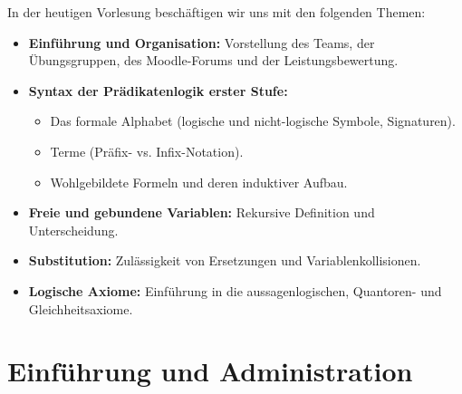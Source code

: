 



\begin{nice-box}
In der heutigen Vorlesung beschäftigen wir uns mit den folgenden Themen:
\begin{itemize}
    \item \textbf{Einführung und Organisation:} Vorstellung des Teams, der Übungsgruppen, des Moodle-Forums und der Leistungsbewertung.
    \item \textbf{Syntax der Prädikatenlogik erster Stufe:}
    \begin{itemize}
        \item Das formale Alphabet (logische und nicht-logische Symbole, Signaturen).
        \item Terme (Präfix- vs. Infix-Notation).
        \item Wohlgebildete Formeln und deren induktiver Aufbau.
    \end{itemize}
    \item \textbf{Freie und gebundene Variablen:} Rekursive Definition und Unterscheidung.
    \item \textbf{Substitution:} Zulässigkeit von Ersetzungen und Variablenkollisionen.
    \item \textbf{Logische Axiome:} Einführung in die aussagenlogischen, Quantoren- und Gleichheitsaxiome.
\end{itemize}
\end{nice-box}

\section{Einführung und Administration}

